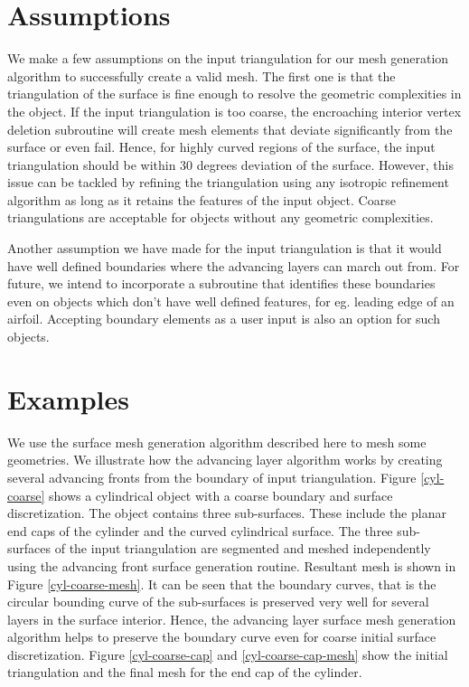 \documentclass[conf]{new-aiaa}
\begin{document}
\section{Assumptions}

We make a few assumptions on the input triangulation for our mesh generation algorithm to successfully create a valid mesh. The first one is that the triangulation of the surface is fine enough to resolve the geometric complexities in the object. If the input triangulation is too coarse, the encroaching interior vertex deletion subroutine will create mesh elements that deviate significantly from the surface or even fail. Hence, for highly curved regions of the surface, the input triangulation should be within 30 degrees deviation of the surface. However, this issue can be tackled by refining the triangulation using any isotropic refinement algorithm as long as it retains the features of the input object. Coarse triangulations are acceptable for objects without any geometric complexities.

Another assumption we have made for the input triangulation is that it would have well defined boundaries where the advancing layers can march out from. For future, we intend to incorporate a subroutine that identifies these boundaries even on objects which don't have well defined features, for eg. leading edge of an airfoil. Accepting boundary elements as a user input is also an option for such objects.

\section{Examples}

We use the surface mesh generation algorithm described here to mesh some geometries. We illustrate how the advancing layer algorithm works by creating several advancing fronts from the boundary of input triangulation. Figure \ref{cyl-coarse} shows a cylindrical object with a coarse boundary and surface discretization. The object contains three sub-surfaces. These include the planar end caps of the cylinder and the curved cylindrical surface. The three sub-surfaces of the input triangulation are segmented and meshed  independently using the advancing front surface generation routine. Resultant mesh is shown in Figure \ref{cyl-coarse-mesh}. It can be seen that the boundary curves, that is the circular bounding curve of the sub-surfaces is preserved very well for several layers in the surface interior. Hence, the advancing layer surface mesh generation algorithm helps to preserve the boundary curve even for coarse initial surface discretization. Figure \ref{cyl-coarse-cap} and \ref{cyl-coarse-cap-mesh} show the initial triangulation and the final mesh for the end cap of the cylinder. 
\end{document}

